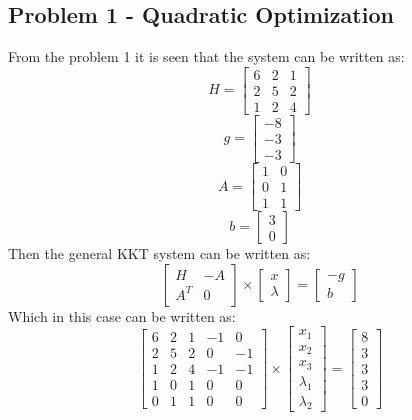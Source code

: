 
\subsection{Problem 1 - Quadratic Optimization}
From the problem 1 it is seen that the system can be written as:
\[H=\begin{bmatrix}
	6 & 2 & 1 \\2 & 5 & 2 \\1 & 2 & 4
\end{bmatrix}\]
\[g=\begin{bmatrix}
	-8 \\-3 \\ -3
\end{bmatrix}\]
\[A=\begin{bmatrix}
	1 & 0 \\ 0 & 1 \\ 1 & 1
\end{bmatrix}\]
\[b= \begin{bmatrix}
	3 \\ 0
\end{bmatrix}\]
Then the general KKT system can be written as:
\[\begin{bmatrix}
	H & -A \\A^T & 0
\end{bmatrix} \times \begin{bmatrix}
	x\\ \lambda
\end{bmatrix} =\begin{bmatrix}
	-g\\ b
\end{bmatrix}\]
Which in this case can be written as:
\[\begin{bmatrix}
	6 & 2 & 1 & -1 & 0\\2 & 5 & 2 & 0 & -1\\1 & 2 & 4 & -1 & -1 \\
1 & 0 & 1 & 0 & 0\\ 0 & 1 & 1 & 0 & 0
\end{bmatrix} \times \begin{bmatrix}
	x_1 \\ x_2 \\ x_3 \\ \lambda_1 \\ \lambda_2
\end{bmatrix} =\begin{bmatrix}
	8 \\3 \\ 3\\ 3 \\ 0
\end{bmatrix}\]

